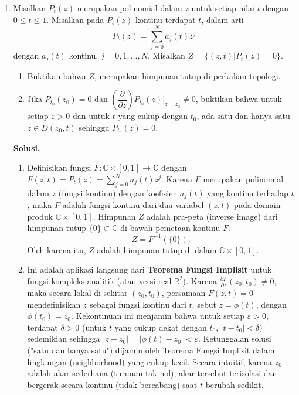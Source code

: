 \documentclass[12pt,twoside]{article}
\newenvironment{solution}
{
	\par\noindent\textbf{\underline{Solusi.}}\\
}
{
	\par
}
\begin{document}
\begin{enumerate}
  \item Misalkan $P_t(z)$ merupakan polinomial dalam $z$ untuk setiap nilai $t$ dengan $0\leq t\leq 1$. Misalkan pada $P_t(z)$ kontinu terdapat $t$, dalam arti
        $$P_t(z)=\sum_{j=0}^{N}a_j(t)z^j$$
        dengan $a_j(t)$ kontinu, $j=0,1,\dots,N$. Misalkan $Z=\{(z,t)|P_t(z)=0\}$.
        \begin{enumerate}
          \item [(a)] Buktikan bahwa $Z$, merupakan himpunan tutup di perkalian topologi.
          \item[(b)] Jika $P_{t_0}(z_0)=0$ dan $\left(\dfrac{\partial }{\partial z}\right)P_{t_0}(z)\big|_{z=z_0}\neq 0$, buktikan  bahwa untuk setiap $\varepsilon>0$ dan untuk $t$ yang cukup dengan $t_0$, ada satu dan hanya satu $z\in D(z_0,t)$ sehingga $P_{t_0}(z)=0$.
        \end{enumerate}
        \begin{solution}
          \begin{enumerate}
            \item[(a)] Definisikan fungsi $F: \mathbb{C} \times [0,1] \to \mathbb{C}$ dengan $F(z,t) = P_t(z) = \sum_{j=0}^N a_j(t) z^j$.
                  Karena $F$ merupakan polinomial dalam $z$ (fungsi kontinu) dengan koefisien $a_j(t)$ yang kontinu terhadap $t$, maka $F$ adalah fungsi kontinu dari dua variabel $(z,t)$ pada domain produk $\mathbb{C} \times [0,1]$.
                  Himpunan $Z$ adalah pra-peta (inverse image) dari himpunan tutup $\{0\} \subset \mathbb{C}$ di bawah pemetaan kontinu $F$.
                  $$ Z = F^{-1}(\{0\}). $$
                  Oleh karena itu, $Z$ adalah himpunan tutup di dalam $\mathbb{C} \times [0,1]$.

            \item[(b)] Ini adalah aplikasi langsung dari \textbf{Teorema Fungsi Implisit} untuk fungsi kompleks analitik (atau versi real $\mathbb{R}^2$).
                  Karena $\frac{\partial F}{\partial z}(z_0, t_0) \neq 0$, maka secara lokal di sekitar $(z_0, t_0)$, persamaan $F(z,t)=0$ mendefinisikan $z$ sebagai fungsi kontinu dari $t$, sebut $z = \phi(t)$, dengan $\phi(t_0)=z_0$.
                  Kekontinuan ini menjamin bahwa untuk setiap $\varepsilon > 0$, terdapat $\delta > 0$ (untuk $t$ yang cukup dekat dengan $t_0$, $|t-t_0|<\delta$) sedemikian sehingga $|z - z_0| = |\phi(t) - z_0| < \varepsilon$.
                  Ketunggalan solusi ("satu dan hanya satu") dijamin oleh Teorema Fungsi Implisit dalam lingkungan (neighborhood) yang cukup kecil.
                  Secara intuitif, karena $z_0$ adalah akar sederhana (turunan tak nol), akar tersebut terisolasi dan bergerak secara kontinu (tidak bercabang) saat $t$ berubah sedikit.
          \end{enumerate}
        \end{solution}

\end{enumerate}
\newpage
\end{document}
